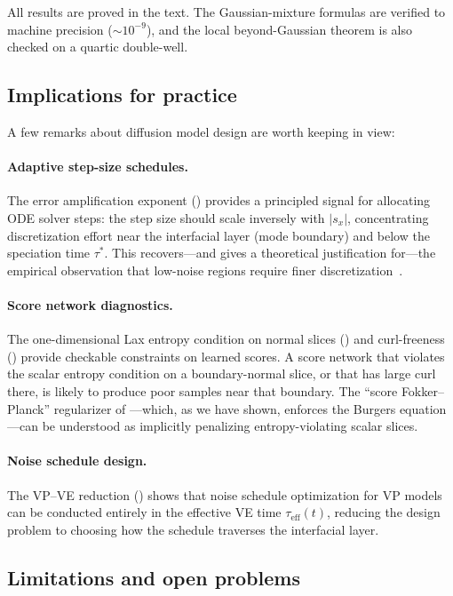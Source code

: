 \documentclass[11pt]{article}
\begin{document}
All results are proved in the text. The Gaussian-mixture formulas are verified to machine precision (${\sim}10^{-9}$), and the local beyond-Gaussian theorem is also checked on a quartic double-well.

\subsection{Implications for practice}

A few remarks about diffusion model design are worth keeping in view:

\paragraph{Adaptive step-size schedules.}
The error amplification exponent () provides a principled signal for allocating ODE solver steps: the step size should scale inversely with $|s_x|$, concentrating discretization effort near the interfacial layer (mode boundary) and below the speciation time $\tau^\ast$.
This recovers---and gives a theoretical justification for---the empirical observation that low-noise regions require finer discretization~\citep{karras2022elucidating, song2021ddim}.

\paragraph{Score network diagnostics.}
The one-dimensional Lax entropy condition on normal slices () and curl-freeness () provide checkable constraints on learned scores.
A score network that violates the scalar entropy condition on a boundary-normal slice, or that has large curl there, is likely to produce poor samples near that boundary.
The ``score Fokker--Planck'' regularizer of \citet{lai2023fp}---which, as we have shown, enforces the Burgers equation---can be understood as implicitly penalizing entropy-violating scalar slices.

\paragraph{Noise schedule design.}
The VP--VE reduction () shows that noise schedule optimization for VP models can be conducted entirely in the effective VE time $\tau_{\mathrm{eff}}(t)$, reducing the design problem to choosing how the schedule traverses the interfacial layer.

\subsection{Limitations and open problems}
\end{document}
